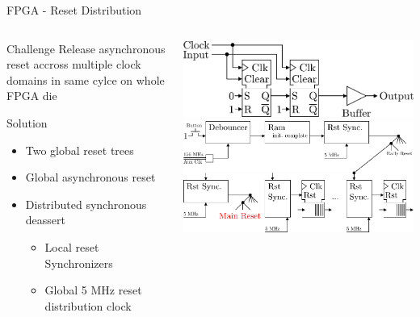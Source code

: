 \documentclass[10pt]{beamer}
\begin{document}
\begin{frame}{FPGA - Reset Distribution}
  \begin{columns}[T]
    \begin{column}{.4\textwidth}
      \begin{block}{Challenge}
        Release asynchronous reset accross multiple
        clock domains in same cylce on whole FPGA die
      \end{block}

      \begin{block}{Solution}
        \begin{itemize}
        \item Two global reset trees
        \item Global asynchronous reset
        \item Distributed synchronous deassert
          \begin{itemize}
          \item Local reset Synchronizers
          \item Global 5 MHz reset distribution clock
          \end{itemize}
        \end{itemize}
      \end{block}
    \end{column}
    \begin{column}{.6\textwidth}
      \includegraphics[width=\textwidth]{figures/RstSync} \\
      \vspace{4ex}
      \includegraphics[width=\textwidth]{figures/rst_generation}
    \end{column}
  \end{columns}
\end{frame}
\end{document}
